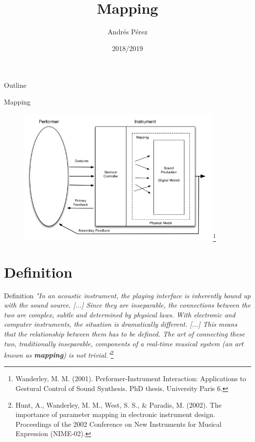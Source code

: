 \documentclass{beamer}
\title[Mapping]{Mapping}
\author{Andrés Pérez}
\institute{Digital Lutherie\\Master en Música para Experiencias del Entretenimiento\\ENTI-UB}
\date{2018/2019}
\newcommand\blfootnote[1]{%
  \begingroup
  \renewcommand\thefootnote{}\footnote{#1}%
  \addtocounter{footnote}{-1}%
  \endgroup
}
\begin{document}
\begin{frame}
  \titlepage
\end{frame}



\begin{frame}{Outline}
 \tableofcontents
\end{frame}

\begin{frame}{Mapping}
    \begin{figure}[h]
        \includegraphics[width=0.9\textwidth]{instrument_scheme.png}\blfootnote{Wanderley, M. M. (2001). Performer-Instrument Interaction: Applications to Gestural Control of Sound Synthesis. PhD thesis, University Paris 6.}
    \end{figure}
\end{frame}


\section{Definition}

\begin{frame}{Definition}
    \textit{"In an acoustic instrument, the playing interface is inherently bound up with the sound source. [...] Since they are inseparable, the connections between the two are complex, subtle and determined by physical laws. With electronic and computer instruments, the situation is dramatically different. [...] This means that the relationship between them has to be defined. The art of connecting these two, traditionally inseparable, components of a real-time musical system (an art known as \textbf{mapping}) is not trivial."}\footnote{Hunt, A., Wanderley, M. M., West, S. S., \& Paradis, M. (2002). The importance of parameter mapping in electronic instrument design. Proceedings of the 2002 Conference on New Instruments for Musical Expression (NIME-02).}
\end{frame}
\end{document}
